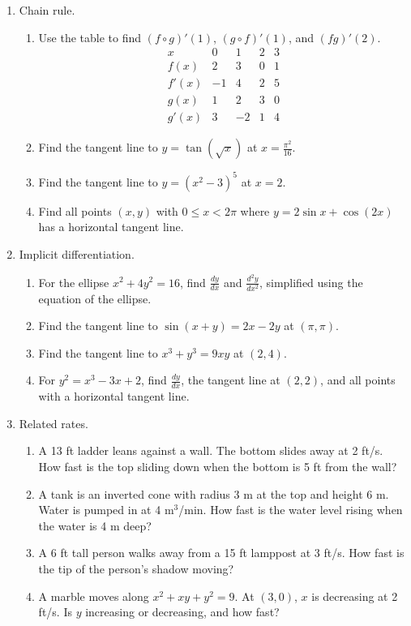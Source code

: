 \documentclass[12pt]{article}
\begin{document}
\begin{enumerate}
\item[10.] Chain rule.
\begin{enumerate}
\item[(a)] Use the table to find $(f \circ g)'(1)$, $(g \circ f)'(1)$, and $(fg)'(2)$. $$\begin{array}{c|cccc} x & 0 & 1 & 2 & 3 \\ \hline f(x) & 2 & 3 & 0 & 1 \\ f'(x) & -1 & 4 & 2 & 5 \\ g(x) & 1 & 2 & 3 & 0 \\ g'(x) & 3 & -2 & 1 & 4 \end{array}$$
\item[(b)] Find the tangent line to $y = \tan(\sqrt{x})$ at $x = \frac{\pi^2}{16}$.
\item[(c)] Find the tangent line to $y = (x^2-3)^5$ at $x = 2$.
\item[(d)] Find all points $(x,y)$ with $0 \leq x < 2\pi$ where $y = 2\sin x + \cos(2x)$ has a horizontal tangent line.
\end{enumerate}
\item[11.] Implicit differentiation.
\begin{enumerate}
\item[(a)] For the ellipse $x^2 + 4y^2 = 16$, find $\frac{dy}{dx}$ and $\frac{d^2y}{dx^2}$, simplified using the equation of the ellipse.
\item[(b)] Find the tangent line to $\sin(x+y) = 2x - 2y$ at $(\pi, \pi)$.
\item[(c)] Find the tangent line to $x^3 + y^3 = 9xy$ at $(2,4)$.
\item[(d)] For $y^2 = x^3 - 3x + 2$, find $\frac{dy}{dx}$, the tangent line at $(2,2)$, and all points with a horizontal tangent line.
\end{enumerate}
\item[12.] Related rates.
\begin{enumerate}
\item[(a)] A 13 ft ladder leans against a wall. The bottom slides away at 2 ft/s. How fast is the top sliding down when the bottom is 5 ft from the wall?
\item[(b)] A tank is an inverted cone with radius 3 m at the top and height 6 m. Water is pumped in at 4 $\text{m}^3$/min. How fast is the water level rising when the water is 4 m deep?
\item[(c)] A 6 ft tall person walks away from a 15 ft lamppost at 3 ft/s. How fast is the tip of the person's shadow moving?
\item[(d)] A marble moves along $x^2 + xy + y^2 = 9$. At $(3,0)$, $x$ is decreasing at 2 ft/s. Is $y$ increasing or decreasing, and how fast?

\end{enumerate}
\end{enumerate}
\end{document}
